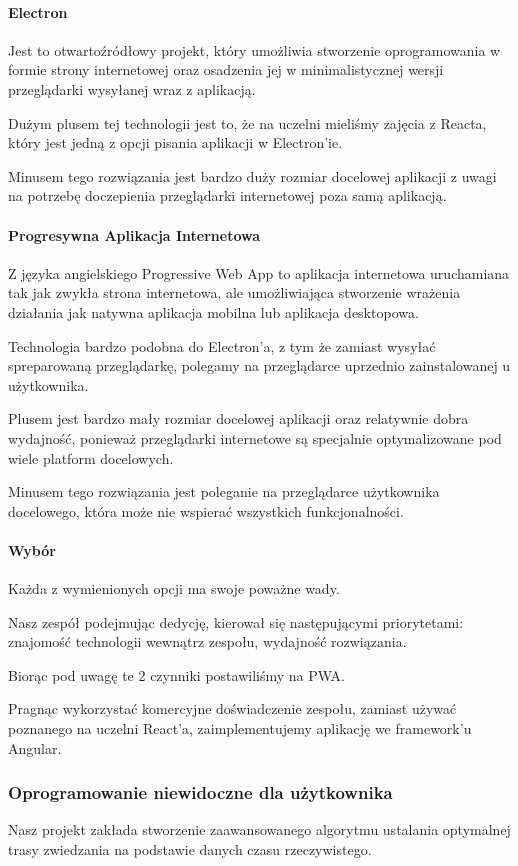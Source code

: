 \paragraph{Electron}
Jest to otwartoźródłowy projekt, który umożliwia stworzenie oprogramowania w formie strony internetowej oraz osadzenia jej w minimalistycznej wersji przeglądarki wysyłanej wraz z aplikacją.

Dużym plusem tej technologii jest to, że na uczelni mieliśmy zajęcia z Reacta, który jest jedną z opcji pisania aplikacji w Electron'ie.

Minusem tego rozwiązania jest bardzo duży rozmiar docelowej aplikacji z uwagi na potrzebę doczepienia przeglądarki internetowej poza samą aplikacją.

\paragraph{Progresywna Aplikacja Internetowa}
Z języka angielskiego Progressive Web App to aplikacja internetowa uruchamiana tak jak zwykła strona internetowa, ale umożliwiająca stworzenie wrażenia działania jak natywna aplikacja mobilna lub aplikacja desktopowa.

Technologia bardzo podobna do Electron'a, z tym że zamiast wysyłać spreparowaną przeglądarkę, polegamy na przeglądarce uprzednio zainstalowanej u użytkownika.

Plusem jest bardzo mały rozmiar docelowej aplikacji oraz relatywnie dobra wydajność, ponieważ przeglądarki internetowe są specjalnie optymalizowane pod wiele platform docelowych.

Minusem tego rozwiązania jest poleganie na przeglądarce użytkownika docelowego, która może nie wspierać wszystkich funkcjonalności.

\paragraph{Wybór}
Każda z wymienionych opcji ma swoje poważne wady.

Nasz zespół podejmując dedycję, kierował się następującymi priorytetami: znajomość technologii wewnątrz zespołu, wydajność rozwiązania.

Biorąc pod uwagę te 2 czynniki postawiliśmy na PWA.

Pragnąc wykorzystać komercyjne doświadczenie zespołu, zamiast używać poznanego na uczelni React'a, zaimplementujemy aplikację we framework'u Angular.

\subsubsection{Oprogramowanie niewidoczne dla użytkownika}
Nasz projekt zakłada stworzenie zaawansowanego algorytmu ustalania optymalnej trasy zwiedzania na podstawie danych czasu rzeczywistego.

